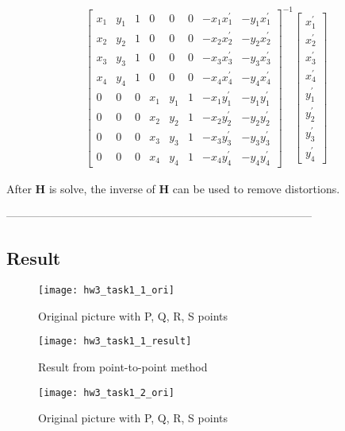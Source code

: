 \documentclass[11pt]{article}
\begin{document}
\begin{align*}
\begin{bmatrix}
x_{1} & y_{1} & 1  & 0 & 0 & 0 & -x_{1}x_1^{'} & -y_{1}x_1^{'}\\ 
x_{2} & y_{2} & 1  & 0 & 0 & 0 & -x_{2}x_2^{'} & -y_{2}x_2^{'}\\ 
x_{3} & y_{3} & 1  & 0 & 0 & 0 & -x_{3}x_3^{'} & -y_{3}x_3^{'}\\ 
x_{4} & y_{4} & 1  & 0 & 0 & 0 & -x_{4}x_4^{'} & -y_{4}x_4^{'}\\ 
0 & 0 & 0 & x_{1} & y_{1} & 1 & -x_{1}y_1^{'} & -y_{1}y_1^{'}\\ 
0 & 0 & 0 & x_{2} & y_{2} & 1 & -x_{2}y_2^{'} & -y_{2}y_2^{'}\\ 
0 & 0 & 0 & x_{3} & y_{3} & 1 & -x_{3}y_3^{'} & -y_{3}y_3^{'}\\ 
0 & 0 & 0 & x_{4} & y_{4} & 1 & -x_{4}y_4^{'} & -y_{4}y_4^{'}
\end{bmatrix}^{-1}
\begin{bmatrix}
x_1^{'}\\ x_2^{'}\\ x_3^{'} \\ x_4^{'} \\ y_1^{'} \\ y_2^{'} \\ y_3^{'} \\ y_4^{'}
\end{bmatrix}
\end{align*}

After $\mathbf{H}$ is solve, the inverse of $\mathbf{H}$ can be used to remove distortions.

-----------------------------------------------------------------------------------

\subsection*{Result}

\begin{figure}[H]
\centering
\texttt{[image: hw3\_task1\_1\_ori]}
\caption{Original picture with P, Q, R, S points}
\label{}
\end{figure}

\begin{figure}[H]
\centering
\texttt{[image: hw3\_task1\_1\_result]}
\caption{Result from point-to-point method}
\label{}
\end{figure}

\begin{figure}[H]
\centering
\texttt{[image: hw3\_task1\_2\_ori]}
\caption{Original picture with P, Q, R, S points}
\label{}
\end{figure}
\end{document}
